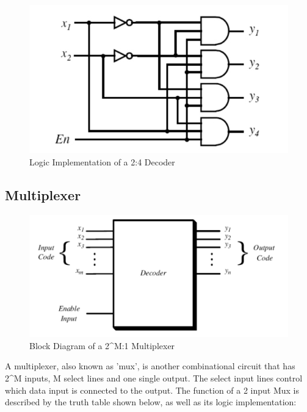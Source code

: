 \begin{figure}[H]
  \begin{centering}
  \includegraphics[scale=1]{decoderlogic.png}
  \par\end{centering}
  \caption{Logic Implementation of a 2:4 Decoder}
\end{figure}


\subsection*{Multiplexer}

\begin{figure}[H]
  \begin{centering}
  \includegraphics[scale=1]{decoder.png}
  \par\end{centering}
  \caption{Block Diagram of a 2^{M}:1 Multiplexer}
\end{figure}

A multiplexer, also known as 'mux', is another combinational circuit that has 2^{M} inputs, M select lines and one single output. The select input lines control which data input is connected to the output. The function of a 2 input Mux is described by the truth table shown below, as well as its logic implementation:



